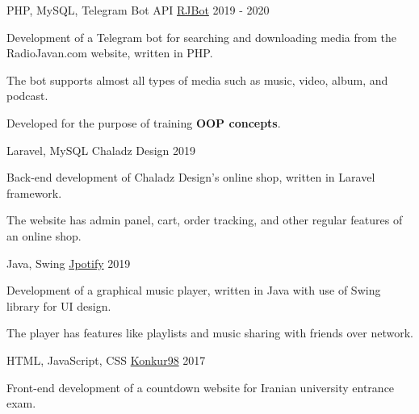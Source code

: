 \begin{cventries}
  \cventry
    {PHP, MySQL, Telegram Bot API} %
    {\href{https://github.com/radinshayanfar/RJBot}{RJBot}} %
    {} %
    {2019 - 2020} %
    {
      \begin{cvitems} %
        \item {Development of a Telegram bot for searching and downloading media from the RadioJavan.com website, written in PHP.}
		    \item {The bot supports almost all types of media such as music, video, album, and podcast.}
		    \item {Developed for the purpose of training \textbf{OOP concepts}.}
      \end{cvitems}
    }

  \cventry
    {Laravel, MySQL} %
    {Chaladz Design} %
    {} %
    {2019} %
    {
      \begin{cvitems} %
        \item {Back-end development of Chaladz Design's online shop, written in Laravel framework.} %
		\item {The website has admin panel, cart, order tracking, and other regular features of an online shop.}
      \end{cvitems}
    }

  \cventry
    {Java, Swing} %
    {\href{https://github.com/radinshayanfar/Jpotify}{Jpotify}} %
    {} %
    {2019} %
    {
      \begin{cvitems} %
        \item {Development of a graphical music player, written in Java with use of Swing library for UI design.}
		\item {The player has features like playlists and music sharing with friends over network.}
      \end{cvitems}
    }

  \cventry
    {HTML, JavaScript, CSS} %
    {\href{https://konkur98.ga}{Konkur98}} %
    {} %
    {2017} %
    {
      \begin{cvitems} %
      	\item {Front-end development of a countdown website for Iranian university entrance exam.}
      \end{cvitems}
    }


\end{cventries}
